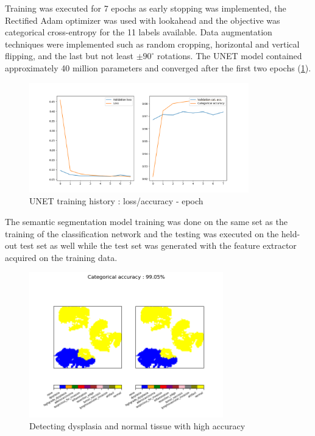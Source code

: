 \documentclass[a4paper,12pt]{article}
\begin{document}
\vspace{4mm}

\par Training was executed for 7 epochs as early stopping was implemented, the Rectified Adam optimizer was used with lookahead and the objective was categorical cross-entropy for the 11 labels available. Data augmentation techniques were implemented such as random cropping, horizontal and vertical flipping, and the last but not least $\pm 90^{\circ}$ rotations. The UNET model contained approximately 40 million parameters and converged after the first two epochs (\ref{fig:unet_training_history}).

\vspace{4mm}

\begin{figure}[H]
    \centering
    \includegraphics[width=0.85\textwidth]{results/unet_training_history.png}
    \caption{UNET training history : loss/accuracy - epoch}
    \label{fig:unet_training_history}
\end{figure}

\vspace{4mm}

\par The semantic segmentation model training was done on the same set as the training of the classification network and the testing was executed on the held-out test set as well while the test set was generated with the feature extractor acquired on the training data.

\vspace{4mm}

\begin{figure}[H]
    \centering
    \includegraphics[width=0.75\textwidth]{results/009_19_5011_I.png}
    \caption{Detecting dysplasia and normal tissue with high accuracy}
    \label{fig:dysplasia_normal_unet}
\end{figure}
\end{document}

